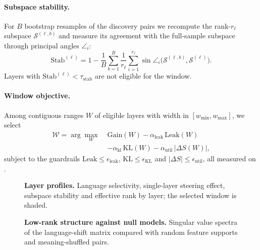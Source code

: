 \paragraph{Subspace stability.}
For $B$ bootstrap resamples of the discovery pairs we recompute the rank-$r_\ell$ subspace $\mathcal{S}^{(\ell,b)}$ and measure its agreement with the full-sample subspace through principal angles $\angle_i$:
\begin{equation*}
\mathrm{Stab}^{(\ell)}=1-\frac{1}{B}\sum_{b=1}^{B}\frac{1}{r_\ell}\sum_{i=1}^{r_\ell}\sin\angle_i\big(\mathcal{S}^{(\ell,b)},\mathcal{S}^{(\ell)}\big).
\end{equation*}
Layers with $\mathrm{Stab}^{(\ell)}<\tau_{\mathrm{stab}}$ are not eligible for the window.

\paragraph{Window objective.}
Among contiguous ranges $W$ of eligible layers with width in $[w_{\min},w_{\max}]$, we select
\begin{equation*}
\begin{aligned}
\mathcal{W}=\arg\max_{W}\;&\mathrm{Gain}(W)-\alpha_{\mathrm{leak}}\,\mathrm{Leak}(W)\\
&-\alpha_{\mathrm{kl}}\,\mathrm{KL}(W)-\alpha_{\mathrm{util}}\,|\Delta S(W)|,
\end{aligned}
\end{equation*}
subject to the guardrails $\mathrm{Leak}\le\epsilon_{\mathrm{leak}}$, $\mathrm{KL}\le\epsilon_{\mathrm{KL}}$ and $|\Delta S|\le\epsilon_{\mathrm{util}}$, all measured on \Ddev.

\begin{figure}[!htbp]
  \centering
  \caption{\textbf{Layer profiles.} Language selectivity, single-layer steering effect, subspace stability and effective rank by layer; the selected window is shaded.}
  \label{fig:app-layer}
\end{figure}

\begin{figure}[!htbp]
  \centering
  \caption{\textbf{Low-rank structure against null models.} Singular value spectra of the language-shift matrix compared with random feature supports and meaning-shuffled pairs.}
  \label{fig:app-spectrum}
\end{figure}

